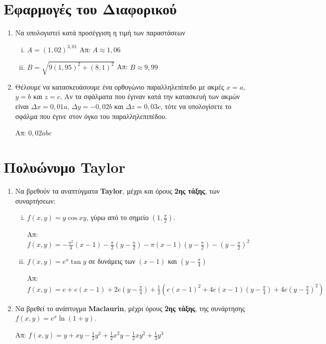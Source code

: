 \section*{Εφαρμογές του Διαφορικού}

\begin{enumerate}
  \item Να υπολογιστεί κατά προσέγγιση η τιμή των παραστάσεων
    \begin{enumerate}[i)]
      \item $A = (1,02)^{3,01} $ \hfill Απ: $ A \approx 1,06 $ 
      \item $B =  \sqrt{ 9(1,95)^{2} + (8,1)^{2} } $ 
        \hfill Απ: $ B \approx 9,99 $ 
    \end{enumerate}

  \item Θέλουμε να κατασκευάσουμε ένα ορθογώνιο παραλληλεπίπεδο με ακμές $ x = a $, 
    $ y=b $ και $ z=c $. Αν τα σφάλματα που έγιναν κατά την κατασκευή των ακμών 
    είναι $ \Delta x = 0,01a $, $ \Delta y = -0,02b $ και $ \Delta z = 0,03c $, 
    τότε να υπολογίσετε το σφάλμα που έγινε στον όγκο του παραλληλεπιπέδου.

    \hfill Απ: $ 0,02abc $ 
\end{enumerate}


\section*{Πολυώνυμο Taylor}

\begin{enumerate}
  \item Να βρεθούν τα αναπτύγματα \textbf{Taylor}, μέχρι και όρους 
    \textbf{2ης τάξης}, των συναρτήσεων:

    \begin{enumerate}[i)]
      \item  $f(x,y)=y\cos{xy} $, γύρω από το σημείο 
        $ \left(1, \frac{ \pi }{ 2 }\right) $.

        \hfill Απ: $f(x,y)=-\frac{\pi^{2}}{4}(x-1) - \frac{ \pi }{ 2 } 
        \left(y - \frac{ \pi }{2 }\right) - \pi(x-1)
        \left(y-\frac{\pi}{2}\right)- \left(y- \frac{ \pi }{ 2} \right)^{2} $

      \item $ f(x,y)=e^{x}\tan{y} $ σε δυνάμεις των $ (x-1) $ και 
        $ \left(y - \frac{ \pi }{ 4 }\right) $

        \hfill Απ: $ f(x,y) = e + e(x-1) + 2e\left(y- \frac{ \pi }{ 4 }\right)
        + \frac{1}{ 2 } \left(e(x-1)^{2}+4e(x-1)\left(y- \frac{ \pi }{ 4 }
        \right) + 4e\left(y- \frac{ \pi }{ 4 } \right)^{2}\right) $
    \end{enumerate}

  \item Να βρεθεί το ανάπτυγμα \textbf{Maclaurin}, μέχρι όρους \textbf{2ης
    τάξης}, της συνάρτησης $ f(x,y) = e^{x}\ln(1+y)$.

    \hfill Απ: $ f(x,y)=y + xy - \frac{1}{ 2 } y^{2} + \frac{1}{ 2 } x^{2}y - 
    \frac{1}{ 2 } xy^{2} + \frac{1}{ 3 } y^{3} $
\end{enumerate}


